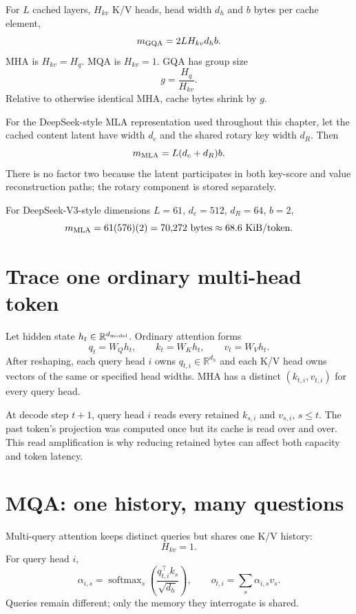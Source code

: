 
For $L$ cached layers, $H_{kv}$ K/V heads, head width $d_h$ and $b$ bytes per cache
element,
\begin{equation}
m_{\rm GQA}=2LH_{kv}d_hb .
\label{eq:ch42-gqa-bytes}
\end{equation}
MHA is $H_{kv}=H_q$. MQA is $H_{kv}=1$. GQA has group size
\[
g=\frac{H_q}{H_{kv}}.
\]
Relative to otherwise identical MHA, cache bytes shrink by $g$.

For the DeepSeek-style MLA representation used throughout this chapter, let the cached
content latent have width $d_c$ and the shared rotary key width $d_R$. Then
\begin{equation}
m_{\rm MLA}=L(d_c+d_R)b .
\label{eq:ch42-mla-bytes}
\end{equation}
There is no factor two because the latent participates in both key-score and value
reconstruction paths; the rotary component is stored separately.

For DeepSeek-V3-style dimensions $L=61$, $d_c=512$, $d_R=64$, $b=2$,
\[
m_{\rm MLA}=61(576)(2)=70{,}272\ {\rm bytes}\approx68.6\ {\rm KiB/token}.
\]

\section{Trace one ordinary multi-head token}

Let hidden state $h_t\in\mathbb{R}^{d_{\rm model}}$. Ordinary attention forms
\[
q_t=W_Qh_t,\qquad k_t=W_Kh_t,\qquad v_t=W_Vh_t.
\]
After reshaping, each query head $i$ owns
$q_{t,i}\in\mathbb{R}^{d_h}$ and each K/V head owns vectors of the same or specified
head widths. MHA has a distinct $(k_{t,i},v_{t,i})$ for every query head.

At decode step $t+1$, query head $i$ reads every retained $k_{s,i}$ and $v_{s,i}$,
$s\le t$. The past token's projection was computed once but its cache is read over and
over. This read amplification is why reducing retained bytes can affect both capacity
and token latency.

\section{MQA: one history, many questions}

Multi-query attention keeps distinct queries but shares one K/V history:
\[
H_{kv}=1.
\]
For query head $i$,
\[
\alpha_{i,s}=\operatorname{softmax}_s
\left(\frac{q_{t,i}^{\top}k_s}{\sqrt{d_h}}\right),\qquad
o_{t,i}=\sum_s\alpha_{i,s}v_s.
\]
Queries remain different; only the memory they interrogate is shared.

